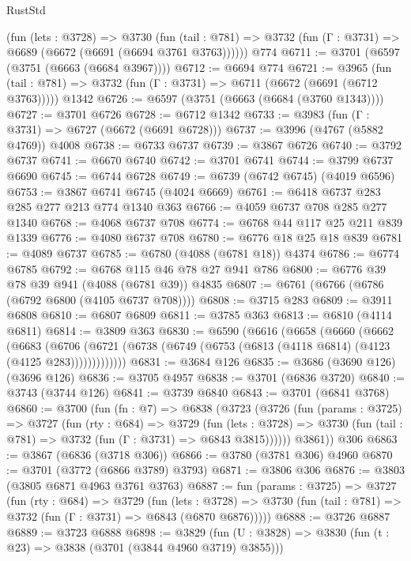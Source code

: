 \begin{lexlean}{RustStd}
\begin{coremodule}
{\begin{coremodule}
{{{{{{{{{{{{{{    (fun (lets : @3728) =>
    @3730
      (fun (tail : @781) => @3732 (fun (Γ : @3731) => @6689 (@6672 (@6691 (@6694 @3761 @3763))))))
    @774
@6711 := @3701 (@6597 (@3751 (@6663 (@6684 @3967))))
@6712 := @6694 @774
@6721 := @3965
    (fun (tail : @781) => @3732 (fun (Γ : @3731) => @6711 (@6672 (@6691 (@6712 @3763)))))
    @1342
@6726 := @6597 (@3751 (@6663 (@6684 (@3760 @1343))))
@6727 := @3701 @6726
@6728 := @6712 @1342
@6733 := @3983 (fun (Γ : @3731) => @6727 (@6672 (@6691 @6728)))
@6737 := @3996 (@4767 (@5882 @4769)) @4008
@6738 := @6733 @6737
@6739 := @3867 @6726
@6740 := @3792 @6737
@6741 := @6670 @6740
@6742 := @3701 @6741
@6744 := @3799 @6737 @6690
@6745 := @6744 @6728
@6749 := @6739 (@6742 @6745) (@4019 @6596)
@6753 := @3867 @6741 @6745 (@4024 @6669)
@6761 := @6418 @6737 @283 @285 @277 @213 @774 @1340 @363
@6766 := @4059 @6737 @708 @285 @277 @1340
@6768 := @4068 @6737 @708
@6774 := @6768 @44 @117 @25 @211 @839 @1339
@6776 := @4080 @6737 @708
@6780 := @6776 @18 @25 @18 @839
@6781 := @4089 @6737
@6785 := @6780 (@4088 (@6781 @18)) @4374
@6786 := @6774 @6785
@6792 := @6768 @115 @46 @78 @27 @941 @786
@6800 := @6776 @39 @78 @39 @941 (@4088 (@6781 @39)) @4835
@6807 := @6761 (@6766 (@6786 (@6792 @6800 (@4105 @6737 @708))))
@6808 := @3715 @283
@6809 := @3911 @6808
@6810 := @6807 @6809
@6811 := @3785 @363
@6813 := @6810 (@4114 @6811)
@6814 := @3809 @363
@6830 := @6590
    (@6616
      (@6658
        (@6660
          (@6662
            (@6683
              (@6706
                (@6721 (@6738 (@6749 (@6753 (@6813 (@4118 @6814) (@4123 (@4125 @283)))))))))))))
@6831 := @3684 @126
@6835 := @3686 (@3690 @126) (@3696 @126)
@6836 := @3705 @4957
@6838 := @3701 (@6836 @3720)
@6840 := @3743 (@3744 @126)
@6841 := @3739 @6840
@6843 := @3701 (@6841 @3768)
@6860 := @3700
    (fun (fn : @7) =>
    @6838
      (@3723
        (@3726
          (fun (params : @3725) =>
          @3727
            (fun (rty : @684) =>
            @3729
              (fun (lets : @3728) =>
              @3730 (fun (tail : @781) => @3732 (fun (Γ : @3731) => @6843 @3815))))))
        @3861))
    @306
@6863 := @3867 (@6836 (@3718 @306))
@6866 := @3780 (@3781 @306) @4960
@6870 := @3701 (@3772 (@6866 @3789) @3793)
@6871 := @3806 @306
@6876 := @3803 (@3805 @6871 @4963 @3761 @3763)
@6887 := fun (params : @3725) =>
  @3727
    (fun (rty : @684) =>
    @3729
      (fun (lets : @3728) =>
      @3730 (fun (tail : @781) => @3732 (fun (Γ : @3731) => @6843 (@6870 @6876)))))
@6888 := @3726 @6887
@6889 := @3723 @6888
@6898 := @3829 (fun (U : @3828) => @3830 (fun (t : @23) => @3838 (@3701 (@3844 @4960 @3719) @3855)))
}}}}}}}}}}}}}}
\end{coremodule}}
\end{coremodule}
\end{lexlean}
